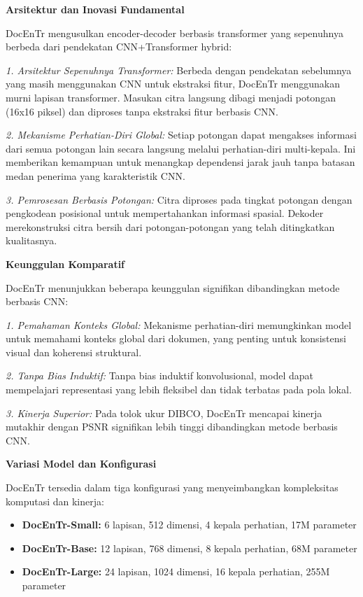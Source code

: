 \documentclass[12pt,a4paper]{article}
\begin{document}
\textbf{Arsitektur dan Inovasi Fundamental}

DocEnTr mengusulkan encoder-decoder berbasis transformer yang sepenuhnya berbeda dari pendekatan CNN+Transformer hybrid:

\textit{1. Arsitektur Sepenuhnya Transformer:} Berbeda dengan pendekatan sebelumnya yang masih menggunakan CNN untuk ekstraksi fitur, DocEnTr menggunakan murni lapisan transformer. Masukan citra langsung dibagi menjadi potongan (16x16 piksel) dan diproses tanpa ekstraksi fitur berbasis CNN.

\textit{2. Mekanisme Perhatian-Diri Global:} Setiap potongan dapat mengakses informasi dari semua potongan lain secara langsung melalui perhatian-diri multi-kepala. Ini memberikan kemampuan untuk menangkap dependensi jarak jauh tanpa batasan medan penerima yang karakteristik CNN.

\textit{3. Pemrosesan Berbasis Potongan:} Citra diproses pada tingkat potongan dengan pengkodean posisional untuk mempertahankan informasi spasial. Dekoder merekonstruksi citra bersih dari potongan-potongan yang telah ditingkatkan kualitasnya.

\textbf{Keunggulan Komparatif}

DocEnTr menunjukkan beberapa keunggulan signifikan dibandingkan metode berbasis CNN:

\textit{1. Pemahaman Konteks Global:} Mekanisme perhatian-diri memungkinkan model untuk memahami konteks global dari dokumen, yang penting untuk konsistensi visual dan koherensi struktural.

\textit{2. Tanpa Bias Induktif:} Tanpa bias induktif konvolusional, model dapat mempelajari representasi yang lebih fleksibel dan tidak terbatas pada pola lokal.

\textit{3. Kinerja Superior:} Pada tolok ukur DIBCO, DocEnTr mencapai kinerja mutakhir dengan PSNR signifikan lebih tinggi dibandingkan metode berbasis CNN.

\textbf{Variasi Model dan Konfigurasi}

DocEnTr tersedia dalam tiga konfigurasi yang menyeimbangkan kompleksitas komputasi dan kinerja:

\begin{itemize}
    \item \textbf{DocEnTr-Small:} 6 lapisan, 512 dimensi, 4 kepala perhatian, 17M parameter
    \item \textbf{DocEnTr-Base:} 12 lapisan, 768 dimensi, 8 kepala perhatian, 68M parameter
    \item \textbf{DocEnTr-Large:} 24 lapisan, 1024 dimensi, 16 kepala perhatian, 255M parameter
\end{itemize}
\end{document}
